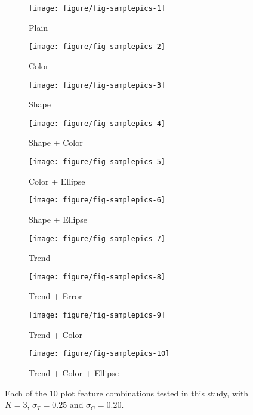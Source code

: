 \documentclass[12pt]{article}\usepackage[]{graphicx}\usepackage[]{color}
\begin{document}
\begin{figure}[ht]
\centering
\begin{subfigure}[t]{0.25\linewidth}
  \caption{Plain}\vspace{-0.15in}
  \texttt{[image: figure/fig-samplepics-1]}
\end{subfigure}
\begin{subfigure}[t]{0.25\linewidth}
  \caption{Color}\vspace{-0.15in}
  \texttt{[image: figure/fig-samplepics-2]}
\end{subfigure}
\begin{subfigure}[t]{0.25\linewidth}
  \caption{Shape}\vspace{-0.15in}
  \texttt{[image: figure/fig-samplepics-3]}
\end{subfigure}
\begin{subfigure}[t]{0.25\linewidth}
  \caption{Shape + Color}\vspace{-0.15in}
  \texttt{[image: figure/fig-samplepics-4]}
\end{subfigure}
\begin{subfigure}[t]{0.25\linewidth}
  \caption{Color + Ellipse}\vspace{-0.15in}
  \texttt{[image: figure/fig-samplepics-5]}
\end{subfigure}
\begin{subfigure}[t]{0.25\linewidth}
  \caption{Shape + Ellipse}\vspace{-0.15in}
  \texttt{[image: figure/fig-samplepics-6]}
\end{subfigure}
\begin{subfigure}[t]{0.25\linewidth}
  \caption{Trend}\vspace{-0.15in}
  \texttt{[image: figure/fig-samplepics-7]}
\end{subfigure}
\begin{subfigure}[t]{0.25\linewidth}
  \caption{Trend + Error }\vspace{-0.15in}
  \texttt{[image: figure/fig-samplepics-8]}
\end{subfigure}
\begin{subfigure}[t]{0.25\linewidth}
  \caption{Trend + Color}\vspace{-0.15in}
  \texttt{[image: figure/fig-samplepics-9]}
\end{subfigure}
\begin{subfigure}[t]{0.25\linewidth}
  \caption{Trend + Color + Ellipse}\vspace{-0.15in}
  \texttt{[image: figure/fig-samplepics-10]}
\end{subfigure}
\caption[Sample lineup stimuli for each of the 10 aesthetic combinations]{Each of the 10 plot feature combinations tested in this study, with $K=3$, $\sigma_T=0.25$ and $\sigma_C=0.20$. \label{fig:plotExamples}}
\end{figure}
\end{document}
